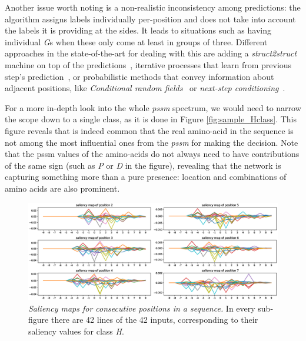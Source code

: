 Another issue worth noting is a non-realistic inconsistency among predictions: the algorithm assigns labels individually per-position and does not take into account the labels it is providing at the sides. It leads to situations such as having individual \textit{G}s when these only come at least in groups of three. Different approaches in the state-of-the-art for dealing with this are adding a \textit{struct2struct} machine on top of the predictions~\cite{Rost1993,Fang2017}, iterative processes that learn from previous step's prediction~\cite{Heffernan2017}, or probabilistic methods that convey information about adjacent positions, like \textit{Conditional random fields}~\cite{Wang2016} or \textit{next-step conditioning}~\cite{Busia2017}.

For a more in-depth look into the whole \textit{pssm} spectrum, we would need to narrow the scope down to a single class, as it is done in Figure \ref{fig:sample_Hclass}. This figure reveals that is indeed common that the real amino-acid in the sequence is not among the most influential ones from the \textit{pssm} for making the decision. Note that the pssm values of the amino-acids do not always need to have contributions of the same sign (such as \textit{P} or \textit{D} in the figure), revealing that the network is capturing something more than a pure presence: location and combinations of amino acids are also prominent.

\begin{figure}
	\centering
	\includegraphics[width=1\linewidth]{Figures/sliding}
	\caption{\textit{Saliency maps for consecutive positions in a sequence.} In every sub-figure there are 42 lines of the 42 inputs, corresponding to their saliency values for class \textit{H}.}
	\label{fig:sliding}
\end{figure}



